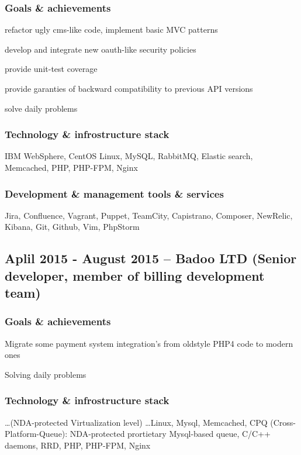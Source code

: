 \documentclass[9pt, a4paper, english]{extarticle}
\begin{document}
    \subsubsection* {Goals \& achievements}
      \begin {list}{\textbullet}{\itemsep=0mm}
        \item refactor ugly cms-like code, implement basic MVC patterns
        \item develop and integrate new oauth-like security policies
        \item provide unit-test coverage
        \item provide garanties of backward compatibility to previous API versions
        \item solve daily problems
      \end{list}
    \subsubsection* {Technology \& infrostructure stack}
      IBM WebSphere, CentOS Linux, MySQL, RabbitMQ, Elastic search, Memcached,
      PHP, PHP-FPM, Nginx
    \subsubsection* {Development \& management tools \& services}
      Jira, Confluence, Vagrant, Puppet, TeamCity, Capistrano, Composer,
      NewRelic, Kibana, Git, Github, Vim, PhpStorm


  \subsection* {Aplil 2015 - August 2015 -- \textbf{Badoo LTD} (Senior developer, member of billing development team)}
    \subsubsection* {Goals \& achievements}
      \begin {list}{\textbullet}{\itemsep=0mm}
        \item Migrate some payment system integration's from oldstyle PHP4 code to modern ones
        \item Solving daily problems
      \end{list}
    \subsubsection* {Technology \& infrostructure stack}
      \ldots (NDA-protected Virtualization level) \ldots Linux, Mysql, Memcached,
      CPQ (Cross-Platform-Queue): NDA-protected prortietary Mysql-based queue,
      C/C++ daemons, RRD, PHP, PHP-FPM, Nginx
\end{document}

